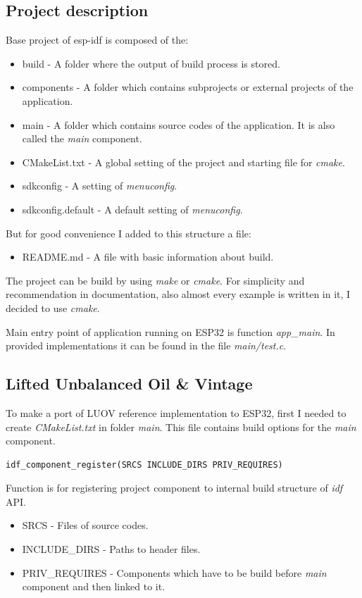 \documentclass[thesis=M,english]{FITthesis}[2019/12/23]
\begin{document}
\subsection{Project description}
Base project of esp-idf is composed of the:
\begin{itemize}
\item	build - A folder where the output of build process is stored.
\item	components - A folder which contains subprojects or external projects of the application.
\item	main - A folder which contains source codes of the application. It is also called the \textit{main} component. 
\item	CMakeList.txt - A global setting of the project and starting file for \textit{cmake}. 
\item	sdkconfig - A setting of \textit{menuconfig}.
\item	sdkconfig.default - A default setting of \textit{menuconfig}.
\end{itemize}
But for good convenience I added to this structure a file:
\begin{itemize}
\item	README.md - A file with basic information about build.
\end{itemize}

\noindent
The project can be build by using \textit{make} or \textit{cmake}. For simplicity and recommendation in documentation, also almost every example is written in it, I decided to use \textit{cmake}.

\bigskip
\noindent
Main entry point of application running on ESP32 is function \textit{app\_main}. In provided implementations it can be found in the file \textit{main/test.c}.

\subsection{Lifted Unbalanced Oil \& Vintage} \label{esp-luov-make}
To make a port of LUOV reference implementation to ESP32, first I needed to create \textit{CMakeList.txt} in folder \textit{main}. This file contains build options for the \textit{main} component.
\begin{lstlisting}[frame=single]
idf_component_register(SRCS INCLUDE_DIRS PRIV_REQUIRES)
\end{lstlisting}
Function is for registering project component to internal build structure of \textit{idf} API.
\begin{itemize}
\item	SRCS  - Files of source codes.
\item	INCLUDE\_DIRS - Paths to header files.
\item	PRIV\_REQUIRES - Components which have to be build before \textit{main} component and then linked to it.
\end{itemize}
\end{document}
